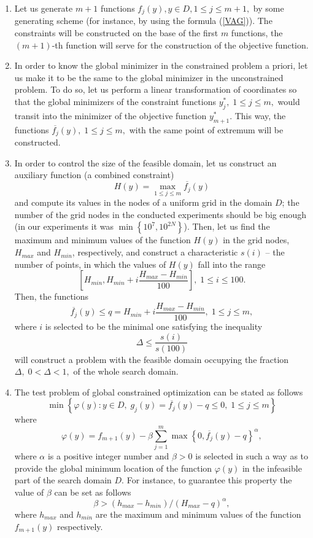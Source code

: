 \documentclass{aip-cp}
\begin{document}
\begin{enumerate}
	\item Let us generate $m+1$ functions $f_j(y), y \in D, 1 \leq j \leq m+1,$ by some generating scheme (for instance, by using the formula (\ref{VAG})). The constraints will be constructed on the base of the first $m$ functions, the $(m+1)$-th function will serve for the construction of the objective function.
	\item In order to know the global minimizer in the constrained problem a priori, let us make it to be the same to the global minimizer in the unconstrained problem. To do so, let us perform a linear transformation of coordinates so that the global minimizers of the constraint functions $y_j^\ast, \; 1 \leq j \leq m,$ would transit into the minimizer of the objective function $y_{m+1}^\ast$. This way, the functions $\overline{f_j}(y), \; 1 \leq j \leq m,$ with the same point of extremum will be constructed.
		\item In order to control the size of the feasible domain, let us construct an auxiliary function (a combined constraint)
		\[
		H(y)=\max_{1 \leq j \leq m}{\overline{f_j}(y)}
		\]
and compute its values in the nodes of a uniform grid in the domain $D$; the number of the grid nodes in the conducted experiments should be big enough (in our experiments it was $\min \left\{10^7, 10^{2N} \right\}$). Then, let us find the maximum and minimum values of the function $H(y)$ in the grid nodes, $H_{max}$ and $H_{min}$, respectively, and construct a characteristic $s(i)$ -- the number of points, in which the values of $H(y)$ fall into the range 
\[
\left[H_{min},H_{min}+i\frac{H_{max}-H_{min}}{100}\right], \; 1 \leq i \leq 100 .
\]
Then, the functions 
\[
\overline{f_j}(y) \leq q = H_{min}+i\frac{H_{max}-H_{min}}{100}, \; 1 \leq j \leq m,
\]
where $i$ is selected to be the minimal one satisfying the inequality
\[
\Delta \leq \frac{s(i)}{s(100)}
\]
will construct a problem with the feasible domain occupying the fraction $\Delta, \; 0<\Delta<1,$ of the whole search domain.
\item 
The test problem of global constrained optimization can be stated as follows
\[
\min\left\{ \varphi(y):y \in D, \; g_j(y)= \overline{f_j}(y)-q \leq 0, \; 1 \leq j \leq m \right\}
\]
where 
\[
\varphi(y) = f_{m+1}(y)-\beta\sum_{j=1}^m\max\left\{0,\overline{f_j}(y) -q \right\}^\alpha,
\]
where $\alpha$ is a positive integer number and $\beta>0$ is selected in such a way as to provide the global minimum location of the function $\varphi(y)$ in the infeasible part of the search domain $D$. For instance, to guarantee this property the value of $\beta$ can be set as follows
\[
\beta>(h_{max}-h_{min})/(H_{max}-q)^\alpha,
\]
where $h_{max}$ and $h_{min}$ are the maximum and minimum values of the function $f_{m+1}(y)$ respectively.

\end{enumerate}
\end{document}
